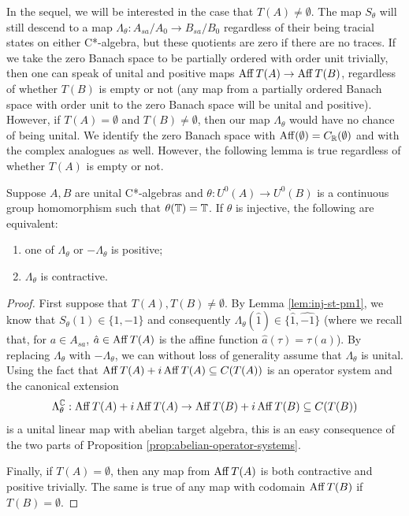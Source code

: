 \documentclass[12pt]{amsart}
\begin{document}
In the sequel, we will be interested in the case that $T(A) \neq \emptyset$. The map $S_\theta$ will still descend to a map $\Lambda_\theta: A_{sa}/A_0 \to B_{sa}/B_0$ regardless of their being tracial states on either C*-algebra, but these quotients are zero if there are no traces. If we take the zero Banach space to be partially ordered with order unit trivially, then one can speak of unital and positive maps $\operatorname{Aff} T(A) \to \operatorname{Aff} T(B)$, regardless of whether $T(B)$ is empty or not (any map from a partially ordered Banach space with order unit to the zero Banach space will be unital and positive). However, if $T(A) = \emptyset$ and $T(B) \neq \emptyset$, then our map $\Lambda_\theta$ would have no chance of being unital. We identify the zero Banach space with $\operatorname{Aff} (\emptyset) = C_{\mathbb{R}}(\emptyset)$ and with the complex analogues as well. However, the following lemma is true regardless of whether $T(A)$ is empty or not. 

\begin{lemma}\label{lem:tildeS-isometric}
Suppose $A,B$ are unital C*-algebras and $\theta: U^0(A) \to U^0(B)$ is a continuous group homomorphism such that $\theta(\mathbb{T}) = \mathbb{T}$. If $\theta$ is injective, the following are equivalent:
\begin{enumerate}
\item one of $\Lambda_\theta$ or $-\Lambda_\theta$ is positive;
\item $\Lambda_\theta$ is contractive.
\end{enumerate}
\begin{proof}
First suppose that $T(A),T(B) \neq \emptyset$. By Lemma \ref{lem:inj-st-pm1}, we know that $S_\theta(1) \in \{1,-1\}$ and consequently $\Lambda_\theta(\hat 1) \in \{\hat{1},\widehat{-1}\}$ (where we recall that, for $a \in A_{sa}$, $\hat{a} \in \operatorname{Aff} T(A)$ is the affine function $\hat{a}(\tau) = \tau(a)$). By replacing $\Lambda_\theta$ with $-\Lambda_\theta$, we can without loss of generality assume that $\Lambda_\theta$ is unital. Using the fact that $\operatorname{Aff} T(A) + i\operatorname{Aff} T(A) \subseteq C(T(A))$ is an operator system and the canonical extension
\begin{equation}
\Lambda_\theta^{\mathbb{C}}: \operatorname{Aff} T(A) + i\operatorname{Aff} T(A) \to \operatorname{Aff} T(B) + i\operatorname{Aff} T(B) \subseteq C(T(B))
\end{equation}
is a unital linear map with abelian target algebra, this is an easy consequence of the two parts of Proposition \ref{prop:abelian-operator-systems}.

Finally, if $T(A) = \emptyset$, then any map from $\operatorname{Aff} T(A)$ is both contractive and positive trivially. The same is true of any map with codomain $\operatorname{Aff} T(B)$ if $T(B) = \emptyset$. 
\end{proof}
\end{lemma}
\end{document}
